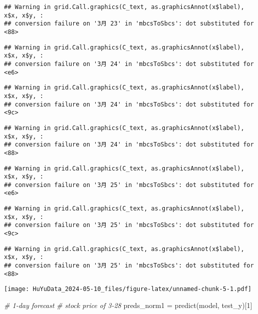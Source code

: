 \documentclass[
]{article}
\newenvironment{Shaded}{\begin{snugshade}}{\end{snugshade}}
\newcommand{\CommentTok}[1]{\textcolor[rgb]{0.56,0.35,0.01}{\textit{#1}}}
\newcommand{\DecValTok}[1]{\textcolor[rgb]{0.00,0.00,0.81}{#1}}
\newcommand{\FunctionTok}[1]{\textcolor[rgb]{0.00,0.00,0.00}{#1}}
\newcommand{\NormalTok}[1]{#1}
\newcommand{\OtherTok}[1]{\textcolor[rgb]{0.56,0.35,0.01}{#1}}
\begin{document}
\begin{verbatim}
## Warning in grid.Call.graphics(C_text, as.graphicsAnnot(x$label), x$x, x$y, :
## conversion failure on '3月 23' in 'mbcsToSbcs': dot substituted for <88>
\end{verbatim}

\begin{verbatim}
## Warning in grid.Call.graphics(C_text, as.graphicsAnnot(x$label), x$x, x$y, :
## conversion failure on '3月 24' in 'mbcsToSbcs': dot substituted for <e6>
\end{verbatim}

\begin{verbatim}
## Warning in grid.Call.graphics(C_text, as.graphicsAnnot(x$label), x$x, x$y, :
## conversion failure on '3月 24' in 'mbcsToSbcs': dot substituted for <9c>
\end{verbatim}

\begin{verbatim}
## Warning in grid.Call.graphics(C_text, as.graphicsAnnot(x$label), x$x, x$y, :
## conversion failure on '3月 24' in 'mbcsToSbcs': dot substituted for <88>
\end{verbatim}

\begin{verbatim}
## Warning in grid.Call.graphics(C_text, as.graphicsAnnot(x$label), x$x, x$y, :
## conversion failure on '3月 25' in 'mbcsToSbcs': dot substituted for <e6>
\end{verbatim}

\begin{verbatim}
## Warning in grid.Call.graphics(C_text, as.graphicsAnnot(x$label), x$x, x$y, :
## conversion failure on '3月 25' in 'mbcsToSbcs': dot substituted for <9c>
\end{verbatim}

\begin{verbatim}
## Warning in grid.Call.graphics(C_text, as.graphicsAnnot(x$label), x$x, x$y, :
## conversion failure on '3月 25' in 'mbcsToSbcs': dot substituted for <88>
\end{verbatim}

\texttt{[image: HuYuData\_2024-05-10\_files/figure-latex/unnamed-chunk-5-1.pdf]}

\begin{Shaded}
\begin{Highlighting}[]
\CommentTok{\# 1{-}day forecast}
\CommentTok{\# stock price of 3{-}28}
\NormalTok{preds\_norm1 }\OtherTok{=} \FunctionTok{predict}\NormalTok{(model, test\_y)[}\DecValTok{1}\NormalTok{]}
\end{Highlighting}
\end{Shaded}
\end{document}

